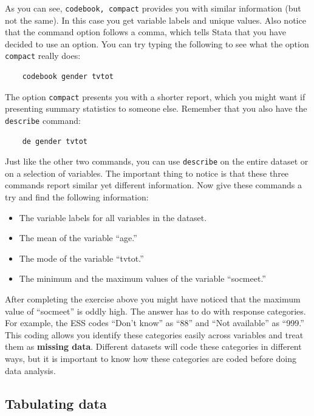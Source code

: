 As you can see, \texttt{codebook, compact} provides you with similar information (but not the same). In this case you get variable labels and unique values. Also notice that the command option follows a comma, which tells Stata that you have decided to use an option. You can try typing the following to see what the option \texttt{compact} really does:

\begin{lstlisting}
	codebook gender tvtot
\end{lstlisting}

The option \texttt{compact} presents you with a shorter report, which you might want if presenting summary statistics to someone else. Remember that you also have the \texttt{describe} command:

\begin{lstlisting}
	de gender tvtot
\end{lstlisting}

Just like the other two commands, you can use \texttt{describe} on the entire dataset or on a selection of variables. The important thing to notice is that these three commands report similar yet different information. Now give these commands a try and find the following information:

\begin{itemize}
	\item The variable labels for all variables in the dataset.
	\item The mean of the variable ``age.''
	\item The mode of the variable ``tvtot.''
	\item The minimum and the maximum values of the variable ``socmeet.''
\end{itemize}

After completing the exercise above you might have noticed that the maximum value of ``socmeet'' is oddly high. The answer has to do with response categories. For example, the ESS codes ``Don't know'' as ``88'' and ``Not available'' as ``999.'' This coding allows you identify these categories easily across variables and treat them as \textbf{missing data}. Different datasets will code these categories in different ways, but it is important to know how these categories are coded before doing data analysis.

\subsection*{Tabulating data}

